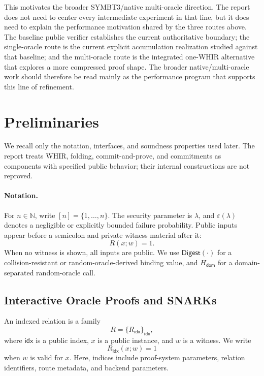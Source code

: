 \documentclass[11pt]{article}
\theoremstyle{definition}
\begin{document}
This motivates the broader SYMBT3/native multi-oracle direction. The report does
not need to center every intermediate experiment in that line, but it does need
to explain the performance motivation shared by the three routes above. The
baseline public verifier establishes the current authoritative boundary; the
single-oracle route is the current explicit accumulation realization studied
against that baseline; and the multi-oracle route is the integrated one-WHIR
alternative that explores a more compressed proof shape. The broader
native/multi-oracle work should therefore be read mainly as the performance
program that supports this line of refinement.

\section{Preliminaries}
\label{sec:preliminaries}

We recall only the notation, interfaces, and soundness properties used later.
The report treats WHIR, folding, commit-and-prove, and commitments as components
with specified public behavior; their internal constructions are not reproved.

\paragraph{Notation.}
For \(n\in\mathbb{N}\), write \([n]=\{1,\ldots,n\}\). The security parameter is
\(\lambda\), and \(\varepsilon(\lambda)\) denotes a negligible or explicitly
bounded failure probability. Public inputs appear before a semicolon and private
witness material after it:
\[
  R(x;w)=1.
\]
When no witness is shown, all inputs are public. We use
\(\mathsf{Digest}(\cdot)\) for a collision-resistant or random-oracle-derived
binding value, and \(H_{\mathsf{dom}}\) for a domain-separated random-oracle
call.

\subsection{Interactive Oracle Proofs and SNARKs}
\label{sec:prelim-iops-snarks}

An indexed relation is a family
\[
  R =
  \{R_{\mathsf{idx}}\}_{\mathsf{idx}},
\]
where \(\mathsf{idx}\) is a public index, \(x\) is a public instance, and \(w\)
is a witness. We write
\[
  R_{\mathsf{idx}}(x;w)=1
\]
when \(w\) is valid for \(x\). Here, indices include proof-system parameters,
relation identifiers, route metadata, and backend parameters.
\end{document}
